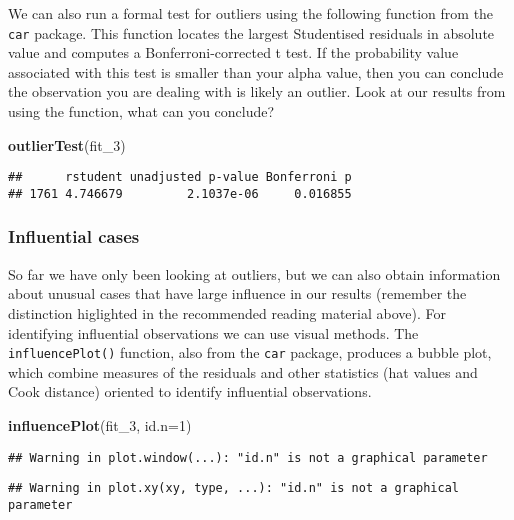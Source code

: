 \documentclass[
]{book}
\newenvironment{Shaded}{\begin{snugshade}}{\end{snugshade}}
\newcommand{\AttributeTok}[1]{\textcolor[rgb]{0.13,0.29,0.53}{#1}}
\newcommand{\DecValTok}[1]{\textcolor[rgb]{0.00,0.00,0.81}{#1}}
\newcommand{\FunctionTok}[1]{\textcolor[rgb]{0.13,0.29,0.53}{\textbf{#1}}}
\newcommand{\NormalTok}[1]{#1}
\begin{document}
We can also run a formal test for outliers using the following function from the \texttt{car} package. This function locates the largest Studentised residuals in absolute value and computes a Bonferroni-corrected t test. If the probability value associated with this test is smaller than your alpha value, then you can conclude the observation you are dealing with is likely an outlier. Look at our results from using the function, what can you conclude?

\begin{Shaded}
\begin{Highlighting}[]
\FunctionTok{outlierTest}\NormalTok{(fit\_3)}
\end{Highlighting}
\end{Shaded}

\begin{verbatim}
##      rstudent unadjusted p-value Bonferroni p
## 1761 4.746679         2.1037e-06     0.016855
\end{verbatim}

\subsubsection{Influential cases}\label{influential-cases}

So far we have only been looking at outliers, but we can also obtain information about unusual cases that have large influence in our results (remember the distinction higlighted in the recommended reading material above). For identifying influential observations we can use visual methods. The \texttt{influencePlot()} function, also from the \texttt{car} package, produces a bubble plot, which combine measures of the residuals and other statistics (hat values and Cook distance) oriented to identify influential observations.

\begin{Shaded}
\begin{Highlighting}[]
\FunctionTok{influencePlot}\NormalTok{(fit\_3, }\AttributeTok{id.n=}\DecValTok{1}\NormalTok{)}
\end{Highlighting}
\end{Shaded}

\begin{verbatim}
## Warning in plot.window(...): "id.n" is not a graphical parameter
\end{verbatim}

\begin{verbatim}
## Warning in plot.xy(xy, type, ...): "id.n" is not a graphical parameter
\end{verbatim}
\end{document}
